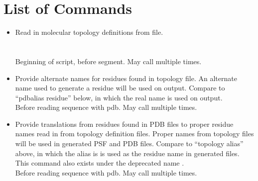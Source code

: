 \section{List of Commands}

\begin{itemize}

\item {}
{Read in molecular topology definitions from file.}
{\\
\\
\\
}
{Beginning of script, before segment.  May call multiple times.}

\item {}
{Provide alternate names for residues found in topology file.
An alternate name used to generate a residue will be used on output.
Compare to ``pdbalias residue'' below, in which the real name
is used on output.}
{\\
}
{Before reading sequence with pdb.  May call multiple times.}

\item {}
{Provide translations from residues found in PDB files to proper
residue names read in from topology definition files.  Proper names
from topology files will be used in generated PSF and PDB files.
Compare to ``topology alias'' above, in which the alias is
is used as the residue name in generated files.
This command also exists under the deprecated name .}
{\\
}
{Before reading sequence with pdb.  May call multiple times.}


\end{itemize}
